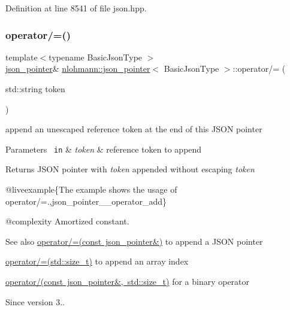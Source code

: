 Definition at line 8541 of file json.\+hpp.

\mbox{\label{classnlohmann_1_1json__pointer_abdd21567b2b1d69329af0f520335e68b}} 
\subsubsection{\texorpdfstring{operator/=()}{operator/=()}\hspace{0.1cm}{\footnotesize\ttfamily [2/3]}}
{\footnotesize\ttfamily template$<$typename Basic\+Json\+Type $>$ \\
\mbox{\hyperlink{classnlohmann_1_1json__pointer}{json\+\_\+pointer}}\& \mbox{\hyperlink{classnlohmann_1_1json__pointer}{nlohmann\+::json\+\_\+pointer}}$<$ Basic\+Json\+Type $>$\+::operator/= (\begin{DoxyParamCaption}\item[{std\+::string}]{token }\end{DoxyParamCaption})\hspace{0.3cm}{\ttfamily [inline]}}



append an unescaped reference token at the end of this J\+S\+ON pointer 


\begin{DoxyParams}[1]{Parameters}
\mbox{\texttt{ in}}  & {\em token} & reference token to append \\
\hline
\end{DoxyParams}
\begin{DoxyReturn}{Returns}
J\+S\+ON pointer with {\itshape token} appended without escaping {\itshape token} 
\end{DoxyReturn}
@liveexample\{The example shows the usage of {\ttfamily operator/=}.,json\+\_\+pointer\+\_\+\+\_\+operator\+\_\+add\}

@complexity Amortized constant.

\begin{DoxySeeAlso}{See also}
\mbox{\hyperlink{classnlohmann_1_1json__pointer_a7395bd0af29ac23fd3f21543c935cdfa}{operator/=(const json\+\_\+pointer\&)}} to append a J\+S\+ON pointer 

\mbox{\hyperlink{classnlohmann_1_1json__pointer_a64c8401529131bad1e486d91d703795f}{operator/=(std\+::size\+\_\+t)}} to append an array index 

\mbox{\hyperlink{classnlohmann_1_1json__pointer_a9f6bc6f4d4668b4e9a19d8b8ac29da4f}{operator/(const json\+\_\+pointer\&, std\+::size\+\_\+t)}} for a binary operator
\end{DoxySeeAlso}
\begin{DoxySince}{Since}
version 3.. 
\end{DoxySince}



